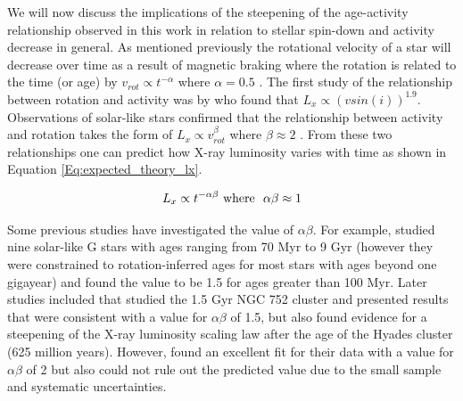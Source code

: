 We will now discuss the implications of the steepening of the age-activity relationship observed in this work in relation to stellar spin-down and activity decrease in general. As mentioned previously the rotational velocity of a star will decrease over time as a result of magnetic braking where the rotation is related to the time (or age) by $v_{rot} \propto t^{-\alpha}$ where $\alpha = 0.5$ \citep{Skumanich_1972,Meibom_etal_2011}. The first study of the relationship between rotation and activity was by \citealp{Pallavicini_etal_1981} who found that $L_{x} \propto (vsin(i))^{1.9}$. Observations of solar-like stars confirmed that the relationship between activity and rotation takes the form of $L_{x} \propto v_{rot}^{\beta}$ where $\beta \approx 2$ \citep{Pizzolato_etal_2003}. From these two relationships one can predict how X-ray luminosity varies with time as shown in Equation \ref{Eq:expected_theory_lx}.

\begin{equation}
	L_{x} \propto t^{-\alpha\beta} \text{\space where \space} \alpha\beta \approx 1
	\label{Eq:expected_theory_lx}
\end{equation}

Some previous studies have investigated the value of $\alpha\beta$. For example, \citealp{Gudel_etal_1997} studied nine solar-like G stars with ages ranging from 70 Myr to 9 Gyr (however they were constrained to rotation-inferred ages for most stars with ages beyond one gigayear) and found the value to be 1.5 for ages greater than 100 Myr. Later studies included \citealp{Giardino_etal_2008} that studied the 1.5 Gyr NGC 752 cluster and presented results that were consistent with a value for $\alpha\beta$ of 1.5, but also found evidence for a steepening of the X-ray luminosity scaling law after the age of the Hyades cluster (625 million years). However, \citealp{Feigelson_etal_2004} found an excellent fit for their data with a value for $\alpha\beta$ of 2 but also could not rule out the predicted value due to the small sample and systematic uncertainties.

